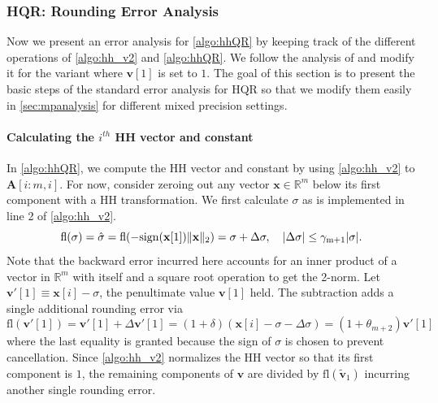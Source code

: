 \documentclass[review,onefignum,onetabnum]{siamart190516}
\newcommand{\R}{\mathbb{R}}
\newcommand{\dd}{\delta}
\newcommand{\tth}{\theta}
\newcommand{\bb}[1]{\mathbf{#1}}
\newcommand{\fl}{\mathrm{fl}}
\newcommand{\cO}{\mathcal{O}}
\begin{document}
\subsubsection{HQR: Rounding Error Analysis}
Now we present an error analysis for \cref{algo:hhQR} by keeping track of the different operations of \cref{algo:hh_v2} and \cref{algo:hhQR}.
We follow the analysis of \cite{Higham2002} and modify it for the variant where $\bb{v}[1]$ is set to $1$.
The goal of this section is to present the basic steps of the standard error analysis for HQR so that we modify them easily in \cref{sec:mpanalysis} for different mixed precision settings.
\paragraph{Calculating the $i^{th}$ HH vector and constant} 
In \cref{algo:hhQR}, we compute the HH vector and constant by using \cref{algo:hh_v2} to $\bb{A}[i:m,i]$.
For now, consider zeroing out any vector $\bb{x}\in\R^m$ below its first component with a HH transformation.
We first calculate $\sigma$ as is implemented in line 2 of \cref{algo:hh_v2}.
\begin{equation}
\label{eqn:sigma}
\fl(\sigma) = \hat{\sigma} = \rm{fl}(-\rm{sign}(\bb{x}[1])\|\bb{x}\|_2) = \sigma + \Delta \sigma,\quad |\Delta\sigma| \leq \gamma_{m+1}|\sigma|.
\end{equation}
Note that the backward error incurred here accounts for an inner product of a vector in $\R^{m}$ with itself and a square root operation to get the 2-norm. 
Let $\bb{v}'[1]\equiv \bb{x}[i]-\sigma$, the penultimate value $\bb{v}[1]$ held. 
The subtraction adds a single additional rounding error via
\begin{equation}
\fl(\bb{v}'[1]) =\bb{v}'[1] + \Delta \bb{v}'[1] = (1+\dd) (\bb{x}[i]-\sigma-\Delta\sigma)= (1+\tth_{m+2})\bb{v}'[1]
\end{equation}
where the last equality is granted because the sign of $\sigma$ is chosen to prevent cancellation.  
Since \cref{algo:hh_v2} normalizes the HH vector so that its first component is $1$, the remaining components of $\bb{v}$ are divided by $\fl(\tilde{\bb{v}}_1)$ incurring another single rounding error.
\end{document}
